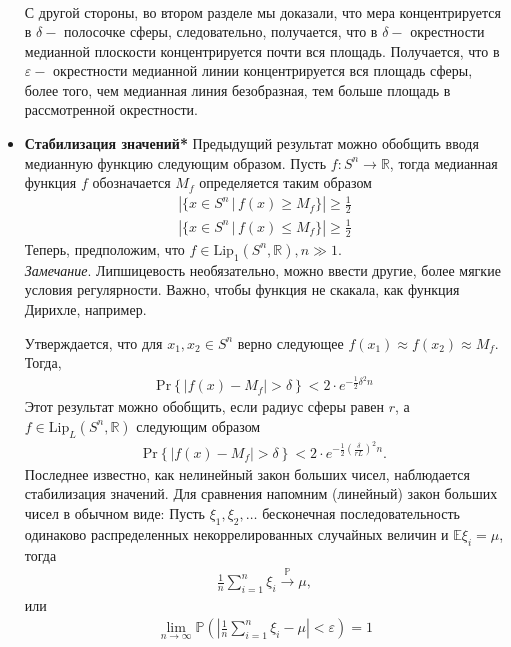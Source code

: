 \documentclass[12pt]{article}
\begin{document}
\begin{itemize}
\begin{eqnarray}
\end{eqnarray}
С другой стороны, во втором разделе мы доказали, что мера концентрируется в $\delta-$ полосочке сферы, следовательно, получается, что в $\delta-$ окрестности медианной плоскости концентрируется почти вся площадь. Получается, что в $\varepsilon-$ окрестности медианной линии концентрируется вся площадь сферы, более того, чем медианная линия безобразная, тем больше площадь в рассмотренной окрестности. 
\item {\bf Стабилизация значений*}
Предыдущий результат можно обобщить вводя медианную функцию следующим образом. Пусть $f : S^n \to \mathbb{R}$, тогда медианная функция $f$ обозначается $M_f$ определяется таким образом 
\begin{eqnarray}
\left| \{x \in S^n \, | \, f(x) \ge M_f \}\right| \ge \frac 1 2 \\
\left| \{x \in S^n \, | \, f(x) \le M_f \}\right| \ge \frac 1 2 
\end{eqnarray}
Теперь, предположим, что $f \in \text{Lip}_1(S^n, \mathbb{R}), n \gg 1$. \\
{\it Замечание}. Липшицевость необязательно, можно ввести другие, более мягкие условия регулярности. Важно, чтобы функция не скакала, как функция Дирихле, например.
\par Утверждается, что для $x_1, x_2 \in S^n$ верно следующее $f(x_1) \approx f(x_2) \approx M_f$. Тогда, 
\begin{eqnarray}
\text{Pr}\left\{|f(x) - M_f| > \delta \right\} < 2 \cdot e^{-\frac 1 2 \delta^2 n}
\end{eqnarray}
Этот результат можно обобщить, если радиус сферы равен $r$, а $f \in \text{Lip}_L(S^n, \mathbb{R})$ следующим образом 
\begin{eqnarray}
\text{Pr}\left\{|f(x) - M_f| > \delta \right\} < 2 \cdot e^{-\frac 1 2 \left(\frac{\delta}{rL}\right)^2 n}.
\end{eqnarray}
Последнее известно, как нелинейный закон больших чисел, наблюдается стабилизация значений. Для сравнения напомним (линейный) закон больших чисел в обычном виде: Пусть $\xi_1, \xi_2, \dots$ бесконечная последовательность одинаково распределенных некоррелированных случайных величин и $\mathbb{E}\xi_i = \mu$, тогда 
\begin{eqnarray}
\frac 1 n \sum_{i=1}^n {\xi_i}  \xrightarrow{\mathbb{P}} \mu,
\end{eqnarray}
или
\begin{eqnarray}
\lim_{n\to \infty} \mathbb{P}\left(\left|\frac 1 n \sum_{i=1}^n {\xi_i} - \mu \right| < \varepsilon\right) = 1

\end{eqnarray}
\end{itemize}
\end{document}
